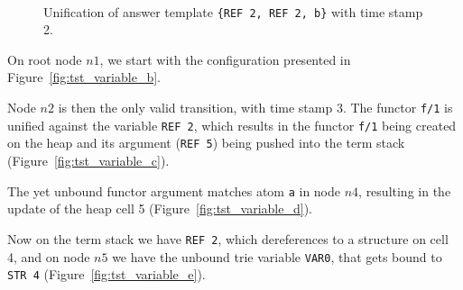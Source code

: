 \begin{figure}
   \qquad
    \\
   
   \caption{Unification of answer template \texttt{\{REF~2,~REF~2,~b\}} with time stamp 2.}
   \label{fig:tst_variable}
\end{figure}

On root node $n1$, we start with the configuration presented in Figure~\ref{fig:tst_variable_b}.

Node $n2$ is then the only valid transition, with time stamp 3.
The functor \texttt{f/1} is unified against the variable \texttt{REF 2},
which results in the functor \texttt{f/1} being created on the heap
and its argument (\texttt{REF 5}) being pushed into the term stack
(Figure~\ref{fig:tst_variable_c}).

The yet unbound functor argument matches atom \texttt{a} in node $n4$,
resulting in the update of the heap cell 5 (Figure~\ref{fig:tst_variable_d}).

Now on the term stack we have \texttt{REF 2}, which dereferences to
a structure on cell 4, and on node $n5$ we have the unbound trie variable
\texttt{VAR0}, that gets bound to \texttt{STR 4} (Figure~\ref{fig:tst_variable_e}).

